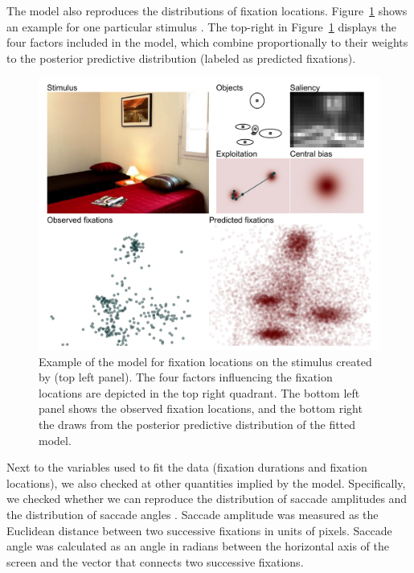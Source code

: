 \documentclass{article}
\begin{document}
The model also reproduces the distributions of fixation locations.  Figure~\ref{fig:predictives_in_sample_xy} shows an example for one particular stimulus \citep[image number $251$ from][]{xu2014beyond}. The top-right in Figure~\ref{fig:predictives_in_sample_xy} displays the four factors included in the model, which combine proportionally to their weights to the posterior predictive distribution (labeled as predicted fixations).

\begin{figure}
    \centering
    \includegraphics[width=\textwidth]{figures/fit_model/in_sample/xy/1251.jpg}
    \caption{Example of the model for fixation locations on the stimulus created by \citet{xu2014beyond} (top left panel). The four factors influencing the fixation locations are depicted in the top right quadrant. The bottom left panel shows the observed fixation locations, and the bottom right the draws from the posterior predictive distribution of the fitted model.}
    \label{fig:predictives_in_sample_xy}
\end{figure}

Next to the variables used to fit the data (fixation durations and fixation locations), we also checked at other quantities implied by the model. Specifically, we checked whether we can reproduce the distribution of saccade amplitudes and the distribution of saccade angles \citep[as these derivative measures provide additional insights into the model performance, e.g., ][]{henderson2018meaning}.  Saccade amplitude was measured as the Euclidean distance between two successive fixations in units of pixels. Saccade angle was calculated as an angle in radians between the horizontal axis of the screen and the vector that connects two successive fixations.
\end{document}
